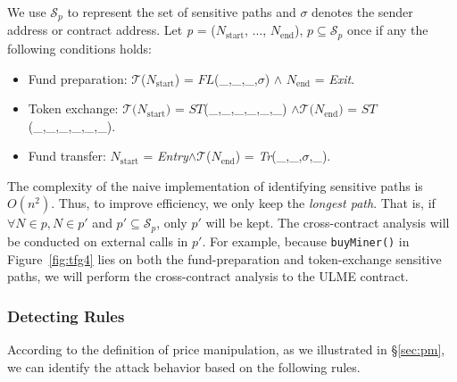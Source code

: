 We use $\mathcal{S}_{\textit{p}}$ to represent the set of sensitive paths and $\sigma$ denotes the sender address or contract address.
Let \textit{p} = ($\textit{N}_{\text{start}}$, ..., $\textit{N}_{\text{end}}$), $\textit{p} \subseteq \mathcal{S}_{\textit{p}}$ once if any the following conditions holds:

\begin{itemize}
    \item Fund preparation: $\mathcal{T}$($\textit{N}_{\text{start}}$) = $\textit{FL}$(\_,\_,\_,$\sigma$)  $\wedge$ $\textit{N}_{\text{end}}$ = \textit{Exit}.

    \item Token exchange: $\mathcal{T}\text{(}\textit{N}_{\text{start}}\text{)}$ = $\textit{ST}$(\_,\_,\_,\_,\_,\_) $\wedge \mathcal{T}\text{(}\textit{N}_{\text{end}}\text{)}$ = $\textit{ST}$(\_,\_,\_,\_,\_,\_).

    \item Fund transfer: $\textit{N}_{\text{start}}$ = \textit{Entry}$\wedge$$\mathcal{T}$($\textit{N}_{\text{end}}$) = \textit{Tr}(\_,\_,$\sigma$,\_).
    
\end{itemize}

The complexity of the naive implementation of identifying sensitive paths is $O(n^2)$. Thus, to improve efficiency, we only keep the \textit{longest path}. That is, if $\forall N\in p, N\in p'$ and $p' \subseteq \mathcal{S}_{\textit{p}}$, only $p'$ will be kept. The cross-contract analysis will be conducted on external calls in $p'$.
For example, because \texttt{buyMiner()} in Figure~\ref{fig:tfg4} lies on both the fund-preparation and token-exchange sensitive paths, we will perform the cross-contract analysis to the ULME contract.

\subsubsection{Detecting Rules}
\label{subsubsec:detecting rules}
According to the definition of price manipulation, as we illustrated in \S\ref{sec:pm}, we can identify the attack behavior based on the following rules.


